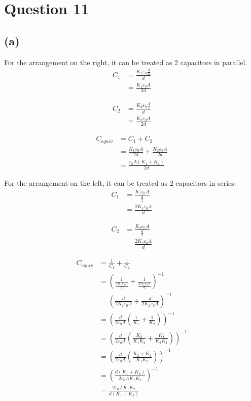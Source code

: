 \documentclass[11pt]{article}
\begin{document}
\newpage

\section{Question 11}
\label{sec:orgf498840}

\subsection{(a)}
\label{sec:orgc6fd42d}
For the arrangement on the right, it can be treated as 2 capacitors in parallel.
\begin{align*}
C_1 &= \frac{K_1 \varepsilon_0 \frac{A}{2}}{d} \\
&= \frac{K_1 \varepsilon_0 A}{2d}
\end{align*}

\begin{align*}
C_2 &= \frac{K_2 \varepsilon_0 \frac{A}{2}}{d} \\
&= \frac{K_2 \varepsilon_0 A}{2d}
\end{align*}

\begin{align*}
C_{equiv} &= C_1 + C_2 \\
&= \frac{K_1 \varepsilon_0 A}{2d} + \frac{K_2 \varepsilon_0 A}{2d} \\
&= \frac{\varepsilon_0 A (K_1 + K_2)}{2d}
\end{align*}

\newpage

For the arrangement on the left, it can be treated as 2 capacitors in series:
\begin{align*}
C_1 &= \frac{K_1 \varepsilon_0 A}{\frac{d}{2}} \\
&= \frac{2K_1 \varepsilon_0 A}{d}
\end{align*}

\begin{align*}
C_2 &= \frac{K_2 \varepsilon_0 A}{\frac{d}{2}} \\
&= \frac{2K_2 \varepsilon_0 A}{d}
\end{align*}

\begin{align*}
C_{equiv} &= \frac{1}{C_1} + \frac{1}{C_2} \\
&= \left( \frac{1}{\frac{2K_1 \varepsilon_0 A}{d}} + \frac{1}{\frac{2K_2 \varepsilon_0 A}{d}} \right)^{-1} \\
&= \left( \frac{d}{2K_1 \varepsilon_0 A} + \frac{d}{2K_2 \varepsilon_0 A} \right)^{-1} \\
&= \left( \frac{d}{2 \varepsilon_0 A} \left( \frac{1}{K_1} + \frac{1}{K_2} \right) \right)^{-1} \\
&= \left( \frac{d}{2 \varepsilon_0 A} \left( \frac{K_2}{K_1 K_2} + \frac{K_1}{K_2 K_1} \right) \right)^{-1} \\
&= \left( \frac{d}{2 \varepsilon_0 A} \left( \frac{K_2 + K_1}{K_1K_2} \right) \right)^{-1} \\
&= \left( \frac{d(K_1 + K_2)}{2 \varepsilon_0 A K_1 K_2} \right)^{-1} \\
&= \frac{2 \varepsilon_0 A K_1 K_2}{d (K_1 + K_2)} \\
\end{align*}
\end{document}
